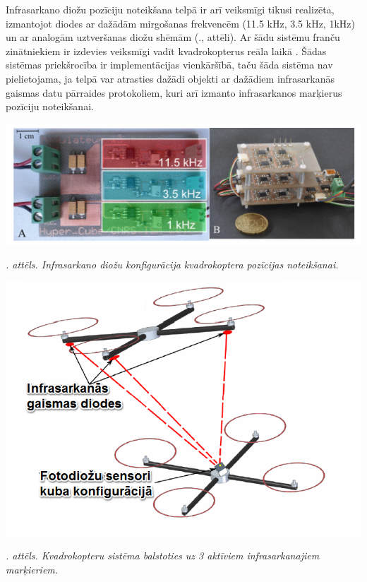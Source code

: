 \documentclass[12pt, a4paper, oneside, openright]{article}
\renewcommand{\thecimages}{\arabic{cimages}}
\begin{document}

\par
Infrasarkano diožu pozīciju noteikšana telpā ir arī veiksmīgi tikusi realizēta, izmantojot diodes ar dažādām
mirgošanas frekvencēm (11.5 kHz, 3.5 kHz, 1kHz) un ar analogām uztveršanas diožu shēmām (.,  attēli). 
Ar šādu sistēmu franču zinātniekiem ir
izdevies veiksmīgi vadīt kvadrokopterus reāla laikā \cite{ThibautRaharijaona2013}. Šādas sistēmas 
priekšrocība ir implementācijas vienkāršībā, taču šāda sistēma nav pielietojama, ja telpā var atrasties
dažādi objekti ar dažādiem infrasarkanās gaismas datu pārraides protokoliem, kuri arī izmanto infrasarkanos marķierus pozīciju noteikšanai.

\label{cimages:ThibautRaharijaona2013_2}
\vspace{10pt}
\begin{samepage}
\begin{center}
\includegraphics[width=0.5\columnwidth]{images/ThibautRaharijaona2013_2.png}
\begin{center}
\footnotesize{
\textit{\thecimages. attēls. Infrasarkano diožu konfigurācija kvadrokoptera pozīcijas noteikšanai.}}
\end{center}
\end{center}
\end{samepage}

\label{cimages:ThibautRaharijaona2013_3}
\vspace{10pt}
\begin{samepage}
\begin{center}
\includegraphics[width=0.5\columnwidth]{images/ThibautRaharijaona2013_3.png}
\begin{center}
\footnotesize{
\textit{\thecimages. attēls. Kvadrokopteru sistēma balstoties uz 3 aktīviem infrasarkanajiem marķieriem.}}
\end{center}
\end{center}
\end{samepage}
\end{document}

